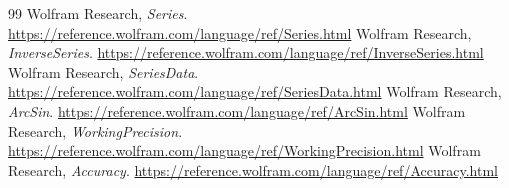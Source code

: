 \documentclass[11pt,letterpaper]{article}
\begin{document}
\begin{thebibliography}{99}
 Wolfram Research, \emph{Series}.\newline
\url{https://reference.wolfram.com/language/ref/Series.html}
 Wolfram Research, \emph{InverseSeries}.\newline
\url{https://reference.wolfram.com/language/ref/InverseSeries.html}
 Wolfram Research, \emph{SeriesData}.\newline
\url{https://reference.wolfram.com/language/ref/SeriesData.html}
 Wolfram Research, \emph{ArcSin}.\newline
\url{https://reference.wolfram.com/language/ref/ArcSin.html}
 Wolfram Research, \emph{WorkingPrecision}.\newline
\url{https://reference.wolfram.com/language/ref/WorkingPrecision.html}
 Wolfram Research, \emph{Accuracy}.\newline
\url{https://reference.wolfram.com/language/ref/Accuracy.html}
\end{thebibliography}
\end{document}
